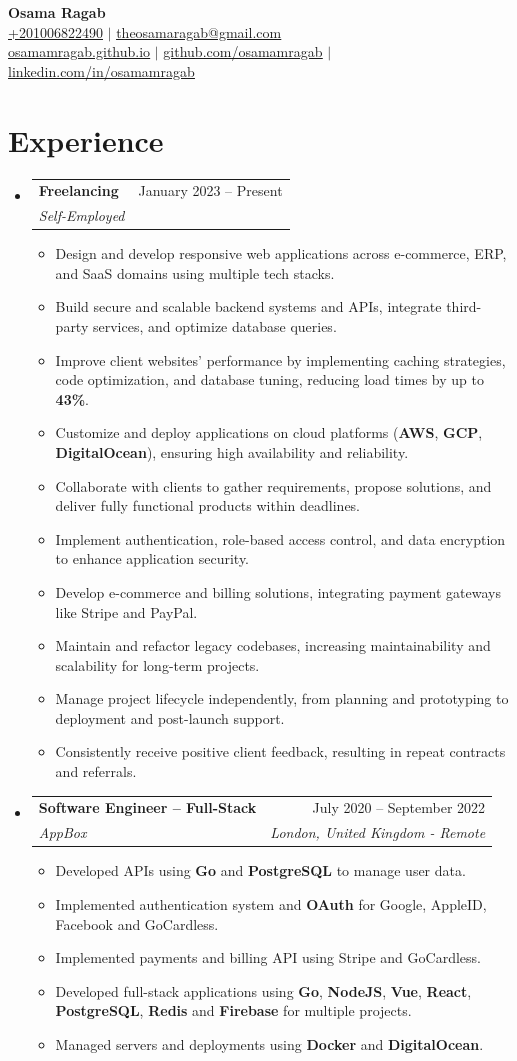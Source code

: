 \documentclass[letterpaper,11pt]{article}
\makeatletter
\newcommand{\resumeItem}[1]{
	\item\small{{#1 \vspace{-2pt}}}
}
\newcommand{\resumeSubHeading}[4]{
	\vspace{-2pt}\item
	\begin{tabular*}{0.97\textwidth}[t]{l@{\extracolsep{\fill}}r}
		\textbf{#1} & #2 \\
		\textit{\small#3} & \textit{\small #4} \\
	\end{tabular*}\vspace{-7pt}
}
\newcommand{\resumeSubHeadingListStart}{\begin{itemize}[leftmargin=0.15in, label={}]}
\newcommand{\resumeSubHeadingListEnd}{\end{itemize}}
\newcommand{\resumeItemListStart}{\begin{itemize}}
\newcommand{\resumeItemListEnd}{\end{itemize}\vspace{-5pt}}
\makeatother
\begin{document}
\begin{center}
	\textbf{\huge{Osama Ragab}} \\ \vspace{5pt}
	\href{tel:+201006822490}{\underline{+201006822490}} $|$
	\href{mailto:theosamaragab@gmail.com}{\underline{theosamaragab@gmail.com}} \\ \vspace{2pt}
	\href{https://osamamragab.github.io/}{\underline{osamamragab.github.io}} $|$
	\href{https://github.com/osamamragab}{\underline{github.com/osamamragab}} $|$
	\href{https://www.linkedin.com/in/osamamragab/}{\underline{linkedin.com/in/osamamragab}}
\end{center}

\section{Experience}
\resumeSubHeadingListStart
	\resumeSubHeading
			{Freelancing}{January 2023 -- Present}
			{Self-Employed}{}
	\resumeItemListStart
		\resumeItem{Design and develop responsive web applications across e-commerce, ERP, and SaaS domains using multiple tech stacks.}
		\resumeItem{Build secure and scalable backend systems and APIs, integrate third-party services, and optimize database queries.}
		\resumeItem{Improve client websites' performance by implementing caching strategies, code optimization, and database tuning, reducing load times by up to \textbf{43\%}.}
		\resumeItem{Customize and deploy applications on cloud platforms (\textbf{AWS}, \textbf{GCP}, \textbf{DigitalOcean}), ensuring high availability and reliability.}
		\resumeItem{Collaborate with clients to gather requirements, propose solutions, and deliver fully functional products within deadlines.}
		\resumeItem{Implement authentication, role-based access control, and data encryption to enhance application security.}
		\resumeItem{Develop e-commerce and billing solutions, integrating payment gateways like Stripe and PayPal.}
		\resumeItem{Maintain and refactor legacy codebases, increasing maintainability and scalability for long-term projects.}
		\resumeItem{Manage project lifecycle independently, from planning and prototyping to deployment and post-launch support.}
		\resumeItem{Consistently receive positive client feedback, resulting in repeat contracts and referrals.}
	\resumeItemListEnd
	\resumeSubHeading
			{Software Engineer -- Full-Stack}{July 2020 -- September 2022}
			{AppBox}{London, United Kingdom - Remote}
	\resumeItemListStart
			\resumeItem{Developed APIs using \textbf{Go} and \textbf{PostgreSQL} to manage user data.}
			\resumeItem{Implemented authentication system and \textbf{OAuth} for Google, AppleID, Facebook and GoCardless.}
			\resumeItem{Implemented payments and billing API using Stripe and GoCardless.}
			\resumeItem{Developed full-stack applications using \textbf{Go}, \textbf{NodeJS}, \textbf{Vue}, \textbf{React}, \textbf{PostgreSQL}, \textbf{Redis} and \textbf{Firebase} for multiple projects.}
			\resumeItem{Managed servers and deployments using \textbf{Docker} and \textbf{DigitalOcean}.}
	\resumeItemListEnd
\resumeSubHeadingListEnd
\end{document}
